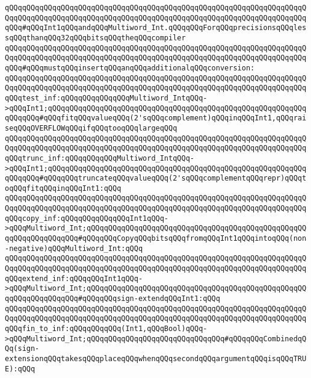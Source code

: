 \verb|qQQqqQQqqQQqqQQqqQQqqQQqqQQqqQQqqQQqqQQqqQQqqQQqqQQqqQQqqQQqqQQqqQQqqQQqqQQqqQQqqQQqqQQqqQQqqQQqqQQqqQQqqQQqqQQqqQQqqQQqqQQqqQQqqQQqqQQqqQQqqQQq#qQQqInt1qQQqandqQQqMultiword_Int.qQQqqQQqForqQQqprecisionsqQQqlessqQQqthanqQQq32qQQqbitsqQQqtheqQQqcompiler|\newline
\verb|qQQqqQQqqQQqqQQqqQQqqQQqqQQqqQQqqQQqqQQqqQQqqQQqqQQqqQQqqQQqqQQqqQQqqQQqqQQqqQQqqQQqqQQqqQQqqQQqqQQqqQQqqQQqqQQqqQQqqQQqqQQqqQQqqQQqqQQqqQQqqQQq#qQQqmustqQQqinsertqQQqanqQQqadditionalqQQqconversion:|\newline
\newline
\verb|qQQqqQQqqQQqqQQqqQQqqQQqqQQqqQQqqQQqqQQqqQQqqQQqqQQqqQQqqQQqqQQqqQQqqQQqqQQqqQQqqQQqqQQqqQQqqQQqqQQqqQQqqQQqqQQqqQQqqQQqqQQqqQQqqQQqqQQqqQQqqQQqtest_inf:qQQqqQQqqQQqqQQqMultiword_IntqQQq->qQQqInt1;qQQqqQQqqQQqqQQqqQQqqQQqqQQqqQQqqQQqqQQqqQQqqQQqqQQqqQQqqQQqqQQqqQQq#qQQqfitqQQqvalueqQQq(2'sqQQqcomplement)qQQqinqQQqInt1,qQQqraiseqQQqOVERFLOWqQQqifqQQqtooqQQqlargeqQQq|\newline
\verb|qQQqqQQqqQQqqQQqqQQqqQQqqQQqqQQqqQQqqQQqqQQqqQQqqQQqqQQqqQQqqQQqqQQqqQQqqQQqqQQqqQQqqQQqqQQqqQQqqQQqqQQqqQQqqQQqqQQqqQQqqQQqqQQqqQQqqQQqqQQqqQQqtrunc_inf:qQQqqQQqqQQqMultiword_IntqQQq->qQQqInt1;qQQqqQQqqQQqqQQqqQQqqQQqqQQqqQQqqQQqqQQqqQQqqQQqqQQqqQQqqQQqqQQqqQQq#qQQqqQQqtruncateqQQqvalueqQQq(2'sqQQqcomplementqQQqrepr)qQQqtoqQQqfitqQQqinqQQqInt1:qQQq|\newline
\verb|qQQqqQQqqQQqqQQqqQQqqQQqqQQqqQQqqQQqqQQqqQQqqQQqqQQqqQQqqQQqqQQqqQQqqQQqqQQqqQQqqQQqqQQqqQQqqQQqqQQqqQQqqQQqqQQqqQQqqQQqqQQqqQQqqQQqqQQqqQQqqQQqcopy_inf:qQQqqQQqqQQqqQQqInt1qQQq->qQQqMultiword_Int;qQQqqQQqqQQqqQQqqQQqqQQqqQQqqQQqqQQqqQQqqQQqqQQqqQQqqQQqqQQqqQQqqQQq#qQQqqQQqCopyqQQqbitsqQQqfromqQQqInt1qQQqintoqQQq(non-negative)qQQqMultiword_Int:qQQq|\newline
\newline
\verb|qQQqqQQqqQQqqQQqqQQqqQQqqQQqqQQqqQQqqQQqqQQqqQQqqQQqqQQqqQQqqQQqqQQqqQQqqQQqqQQqqQQqqQQqqQQqqQQqqQQqqQQqqQQqqQQqqQQqqQQqqQQqqQQqqQQqqQQqqQQqqQQqextend_inf:qQQqqQQqInt1qQQq->qQQqMultiword_Int;qQQqqQQqqQQqqQQqqQQqqQQqqQQqqQQqqQQqqQQqqQQqqQQqqQQqqQQqqQQqqQQqqQQq#qQQqqQQqsign-extendqQQqInt1:qQQq|\newline
\verb|qQQqqQQqqQQqqQQqqQQqqQQqqQQqqQQqqQQqqQQqqQQqqQQqqQQqqQQqqQQqqQQqqQQqqQQqqQQqqQQqqQQqqQQqqQQqqQQqqQQqqQQqqQQqqQQqqQQqqQQqqQQqqQQqqQQqqQQqqQQqqQQqfin_to_inf:qQQqqQQqqQQq(Int1,qQQqBool)qQQq->qQQqMultiword_Int;qQQqqQQqqQQqqQQqqQQqqQQqqQQqqQQq#qQQqqQQqCombinedqQQq(sign-extensionqQQqtakesqQQqplaceqQQqwhenqQQqsecondqQQqargumentqQQqisqQQqTRUE):qQQq|\newline
